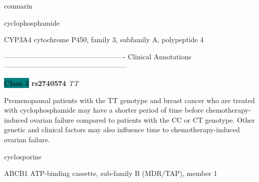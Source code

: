 \documentclass{resume} %
\begin{document}
\begin{rSection}{ coumarin }
\end{rSection}\begin{rSection}{ cyclophosphamide }
\item[]

\begin{rSubsection}{ CYP3A4 }{ cytochrome P450, family 3, subfamily A, polypeptide 4 }{}{}
\item[]

\item[] ---------------------------------------------------- Clinical Annotations -----------------------------------------------------\newline
\item \textbf{\colorbox{teal} {Class 3}} \textbf{ rs2740574 } \textit{ TT }
\item[] Premenopausal patients with the TT genotype and breast cancer who are treated with cyclophosphamide may have a shorter period of time before chemotherapy-induced ovarian failure compared to patients with the CC or CT genotype. Other genetic and clinical factors may also influence time to chemotherapy-induced ovarian failure.
\end{rSubsection}

\end{rSection}\begin{rSection}{ cyclosporine }
\item[]

\begin{rSubsection}{ ABCB1 }{ ATP-binding cassette, sub-family B (MDR/TAP), member 1 }{}{}
\item[]


\end{rSubsection}
\end{rSection}
\end{document}
